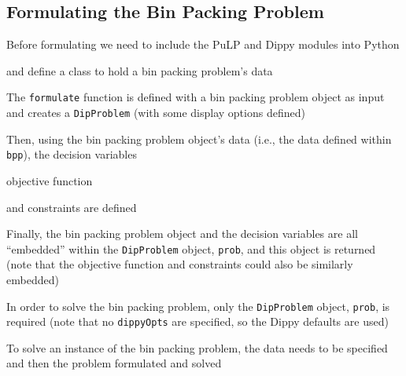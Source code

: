 \subsection{Formulating the Bin Packing Problem} \label{sbs:formulate}

Before formulating we need to include the PuLP and Dippy modules into Python

and define a class to hold a bin packing problem's data


The \lstinline{formulate} function is defined with a bin packing problem object as input and creates a \lstinline{DipProblem} (with some display options defined)


Then, using the bin packing problem object's data (i.e., the data defined within \lstinline{bpp}), the decision variables

objective function

\newpage
and constraints are defined


Finally, the bin packing problem object and the decision variables are all ``embedded'' within the \lstinline{DipProblem} object, \lstinline{prob}, and this object is returned (note that the objective function and constraints could also be similarly embedded)


In order to solve the bin packing problem, only the \lstinline{DipProblem} object, \lstinline{prob}, is required (note that no \lstinline{dippyOpts} are specified, so the Dippy defaults are used)


To solve an instance of the bin packing problem, the data needs to be specified and then the problem formulated and solved



